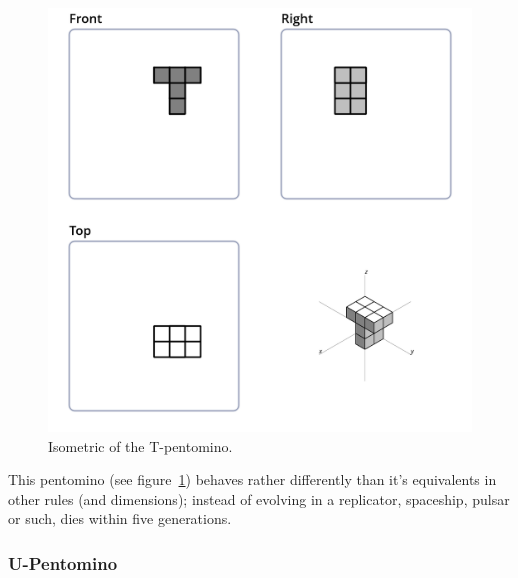 \begin{figure}[H]
	\centering
	\includegraphics[scale=0.3]{iso_diagrams/t.png}
	\caption{Isometric of the T-pentomino.}
	\label{fig:iso-pent-t}
\end{figure}

This pentomino (see figure~\ref{fig:iso-pent-t}) behaves rather differently
than it's equivalents in other rules (and dimensions); instead of evolving in a
replicator, spaceship, pulsar or such, dies within five generations.

\subsubsection{U-Pentomino}
\label{sec:u-pentomino}


